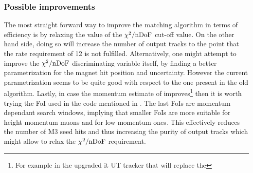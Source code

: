 \subsubsection{Possible improvements}
The most straight forward way to improve the matching algorithm in terms of efficiency is
by relaxing the value of the $\chi^2/\rm nDoF$ cut-off value. On the other hand side, doing so will increase the number
of output tracks to the point that the \hltone rate requirement of 12 \khz is not fulfilled.
Alternatively, one might attempt to improve the $\chi^2/\rm nDoF$ discriminating variable itself,
by finding a better parametrization for the magnet hit position and uncertainty. However the current
parametrization seems to be quite good with respect to the one present in the old \mvm algorithm.
Lastly, in case the momentum estimate of \ttracker improves\footnote{For example in the upgraded it
UT tracker that will replace the \ttracker} then it is worth trying the FoI used in the \muonID code
mentioned in . The last FoIs are momentum dependant search windows, implying
that smaller FoIs are more suitable for height momentum muons and \viceversa for low momentum ones.
This effectively reduces the number of M3 seed hits and thus increasing the purity of output tracks
which might allow to relax the $\chi^2/\rm nDoF$ requirement.

